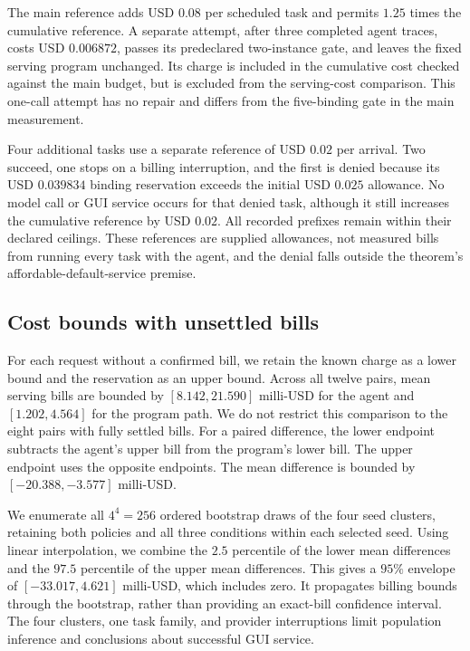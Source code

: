 The main reference adds USD $0.08$ per scheduled task and permits $1.25$ times the cumulative reference.
A separate attempt, after three completed agent traces, costs USD $0.006872$, passes its predeclared two-instance gate, and leaves the fixed serving program unchanged.
Its charge is included in the cumulative cost checked against the main budget, but is excluded from the serving-cost comparison.
This one-call attempt has no repair and differs from the five-binding gate in the main measurement.

Four additional tasks use a separate reference of USD $0.02$ per arrival.
Two succeed, one stops on a billing interruption, and the first is denied because its USD $0.039834$ binding reservation exceeds the initial USD $0.025$ allowance.
No model call or GUI service occurs for that denied task, although it still increases the cumulative reference by USD $0.02$.
All recorded prefixes remain within their declared ceilings.
These references are supplied allowances, not measured bills from running every task with the agent, and the denial falls outside the theorem's affordable-default-service premise.

\subsection{Cost bounds with unsettled bills}
For each request without a confirmed bill, we retain the known charge as a lower bound and the reservation as an upper bound.
Across all twelve pairs, mean serving bills are bounded by $[8.142,21.590]$ milli-USD for the agent and $[1.202,4.564]$ for the program path.
We do not restrict this comparison to the eight pairs with fully settled bills.
For a paired difference, the lower endpoint subtracts the agent's upper bill from the program's lower bill.
The upper endpoint uses the opposite endpoints.
The mean difference is bounded by $[-20.388,-3.577]$ milli-USD.

We enumerate all $4^4=256$ ordered bootstrap draws of the four seed clusters, retaining both policies and all three conditions within each selected seed.
Using linear interpolation, we combine the $2.5$ percentile of the lower mean differences and the $97.5$ percentile of the upper mean differences.
This gives a $95\%$ envelope of $[-33.017,4.621]$ milli-USD, which includes zero.
It propagates billing bounds through the bootstrap, rather than providing an exact-bill confidence interval.
The four clusters, one task family, and provider interruptions limit population inference and conclusions about successful GUI service.
